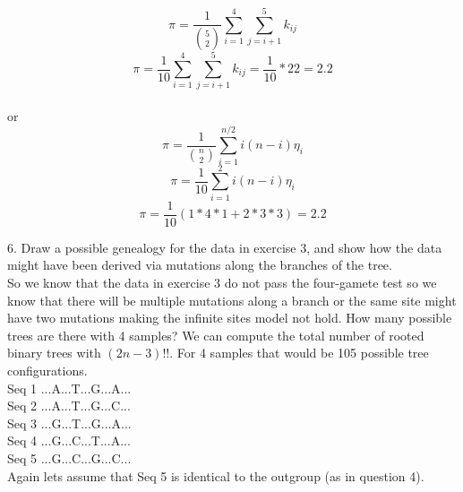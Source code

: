 \documentclass[11pt, oneside]{article}
\begin{document}
\begin{equation*}
\pi=\frac{1}{\binom{5}{2}}\sum_{i=1}^{4}\sum_{j=i+1}^{5}k_{ij}
\end{equation*}
\begin{equation*}
\pi=\frac{1}{10}\sum_{i=1}^{4}\sum_{j=i+1}^{5}k_{ij}=\frac{1}{10}*22=2.2
\end{equation*}
\\
or 
\\
\begin{equation*}
\pi=\frac{1}{\binom{n}{2}}\sum_{i=1}^{n/2}i(n-i)\eta_i
\end{equation*}
\begin{equation*}
\pi=\frac{1}{10}\sum_{i=1}^{2}i(n-i)\eta_i
\end{equation*}
\begin{equation*}
\pi=\frac{1}{10}(1*4*1+2*3*3)=2.2
\end{equation*}

6. Draw a possible genealogy for the data in exercise 3, and show how the data might have been 
derived via mutations along the branches of the tree. \\

So we know that the data in exercise 3 do not pass the four-gamete test so we know that there
will be multiple mutations along a branch or the same site might have two mutations making the 
infinite sites model not hold. How many possible trees are there with 4 samples? 
We can compute the total number of rooted binary trees with $(2n-3)!!$. For 4 samples that would
be 105 possible tree configurations. \\

\noindent
Seq 1 ...A...T...G...A...\\
Seq 2 ...A...T...G...C...\\
Seq 3 ...G...T...G...A...\\
Seq 4 ...G...C...T...A...\\
Seq 5 ...G...C...G...C...\\

Again lets assume that Seq 5 is identical to the outgroup (as in question 4).\\
\end{document}
